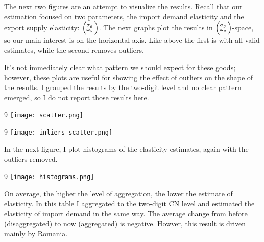 \documentclass[12pt,a4paper]{article}                      %
\begin{document}
\newpage

The next two figures are an attempt to visualize the results.
Recall that our estimation focused on two parameters, the import demand elasticity and the export supply elasticity: $\Bigl(\negthinspace\begin{smallmatrix}\sigma_g\\\omega_g\end{smallmatrix}\Bigr)$.
The next graphs plot the results in $\Bigl(\negthinspace\begin{smallmatrix}\sigma_g\\\omega_g\end{smallmatrix}\Bigr)$-space, so our main interest is on the horizontal axis.
Like above the first is with all valid estimates, while the second removes outliers.

It's not immediately clear what pattern we should expect for these goods;
however, these plots are useful for showing the effect of outliers on the shape of the results.
I grouped the results by the two-digit level and no clear pattern emerged, so I do not report those results here.

\begin{landscape}
\thispagestyle{empty}
\begin{center}
\footnotesize 9
    \texttt{[image: scatter.png]}
\end{center}
\end{landscape}
\restoregeometry


\begin{landscape}
\thispagestyle{empty}
\begin{center}
\footnotesize 9
    \texttt{[image: inliers\_scatter.png]}
\end{center}
\end{landscape}
\restoregeometry

In the next figure, I plot histograms of the elasticity estimates, again with the outliers removed.

\begin{landscape}
\thispagestyle{empty}
\begin{center}
\footnotesize 9
    \texttt{[image: histograms.png]}
\end{center}
\end{landscape}
\restoregeometry

On average, the higher the level of aggregation, the lower the estimate of elasticity.
In this table I aggregated to the two-digit CN level and estimated the elasticity of import demand in the same way.
The average change from before (disaggregated) to now (aggregated) is negative.
Howver, this result is driven mainly by Romania.\\

\noindent
\label{tab:two_means}
\end{document}
